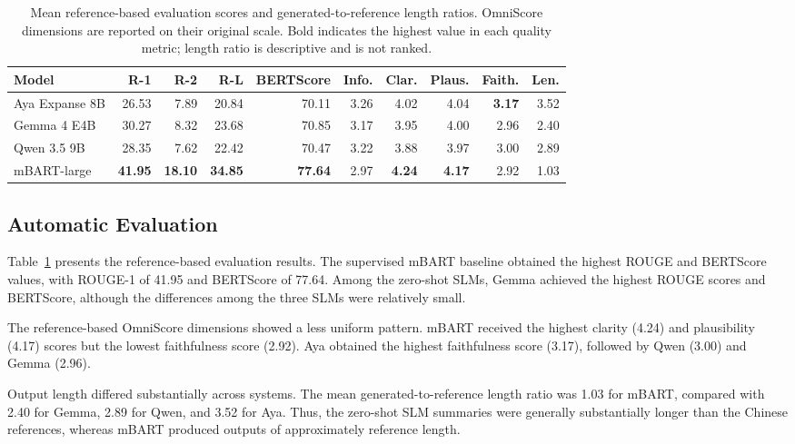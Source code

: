 \documentclass[11pt]{article}
\begin{document}
\begin{table}[!t]
\centering
\small
\begin{tabular}{lrrrrrrrrr}
\hline
Model & R-1 & R-2 & R-L & BERTScore & Info. & Clar. & Plaus. & Faith. & Len. \\
\hline
Aya Expanse 8B & 26.53 & 7.89 & 20.84 & 70.11 & 3.26 & 4.02 & 4.04 & \textbf{3.17} & 3.52 \\
Gemma 4 E4B    & 30.27 & 8.32 & 23.68 & 70.85 & 3.17 & 3.95 & 4.00 & 2.96 & 2.40 \\
Qwen 3.5 9B    & 28.35 & 7.62 & 22.42 & 70.47 & 3.22 & 3.88 & 3.97 & 3.00 & 2.89 \\
mBART-large    & \textbf{41.95} & \textbf{18.10} & \textbf{34.85} &
\textbf{77.64} & 2.97 & \textbf{4.24} & \textbf{4.17} & 2.92 & 1.03 \\
\hline
\end{tabular}
\caption{Mean reference-based evaluation scores and generated-to-reference length ratios. OmniScore dimensions are reported on their original scale. Bold indicates the highest value in each quality metric; length ratio is descriptive and is not ranked.}
\label{tab:automatic-results}
\end{table}

\subsection{Automatic Evaluation}

Table~\ref{tab:automatic-results} presents the reference-based evaluation results. The supervised mBART baseline obtained the highest ROUGE and BERTScore values, with ROUGE-1 of 41.95 and BERTScore of 77.64. Among the zero-shot SLMs, Gemma achieved the highest ROUGE scores and BERTScore, although the differences among the three SLMs were relatively small.

The reference-based OmniScore dimensions showed a less uniform pattern. mBART received the highest clarity (4.24) and plausibility (4.17) scores but the lowest faithfulness score (2.92). Aya obtained the highest faithfulness score (3.17), followed by Qwen (3.00) and Gemma (2.96).

Output length differed substantially across systems. The mean generated-to-reference length ratio was 1.03 for mBART, compared with 2.40 for Gemma, 2.89 for Qwen, and 3.52 for Aya. Thus, the zero-shot SLM summaries were generally substantially longer than the Chinese references, whereas mBART produced outputs of approximately reference length.
\end{document}
